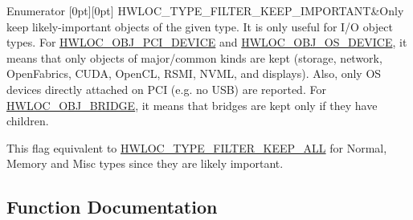 \begin{DoxyEnumFields}{Enumerator}
[0pt][0pt]{}\mbox{\label{a00193_gga9a5a1f0140cd1952544477833733195ba63fd24954e18c83ff7eae9588759adb5}} 
H\+W\+L\+O\+C\+\_\+\+T\+Y\+P\+E\+\_\+\+F\+I\+L\+T\+E\+R\+\_\+\+K\+E\+E\+P\+\_\+\+I\+M\+P\+O\+R\+T\+A\+NT&Only keep likely-\/important objects of the given type. It is only useful for I/O object types. For \hyperlink{a00184_ggacd37bb612667dc437d66bfb175a8dc55a5d8117a54df1fbd3606ab19e42cb0ea9}{H\+W\+L\+O\+C\+\_\+\+O\+B\+J\+\_\+\+P\+C\+I\+\_\+\+D\+E\+V\+I\+CE} and \hyperlink{a00184_ggacd37bb612667dc437d66bfb175a8dc55a51e7280240fd9f25589cbbe538bdb075}{H\+W\+L\+O\+C\+\_\+\+O\+B\+J\+\_\+\+O\+S\+\_\+\+D\+E\+V\+I\+CE}, it means that only objects of major/common kinds are kept (storage, network, Open\+Fabrics, C\+U\+DA, Open\+CL, R\+S\+MI, N\+V\+ML, and displays). Also, only OS devices directly attached on P\+CI (e.\+g. no U\+SB) are reported. For \hyperlink{a00184_ggacd37bb612667dc437d66bfb175a8dc55a6825f10895fea60aca7a6ba9fe273db0}{H\+W\+L\+O\+C\+\_\+\+O\+B\+J\+\_\+\+B\+R\+I\+D\+GE}, it means that bridges are kept only if they have children.

This flag equivalent to \hyperlink{a00193_gga9a5a1f0140cd1952544477833733195bafda7b59e6810dfe778d8f9a4cc1e350e}{H\+W\+L\+O\+C\+\_\+\+T\+Y\+P\+E\+\_\+\+F\+I\+L\+T\+E\+R\+\_\+\+K\+E\+E\+P\+\_\+\+A\+LL} for Normal, Memory and Misc types since they are likely important. \\
\hline

\end{DoxyEnumFields}


\subsection{Function Documentation}
\mbox{\label{a00193_ga09318f81c1d4713be907d64748a6f93c}} 
